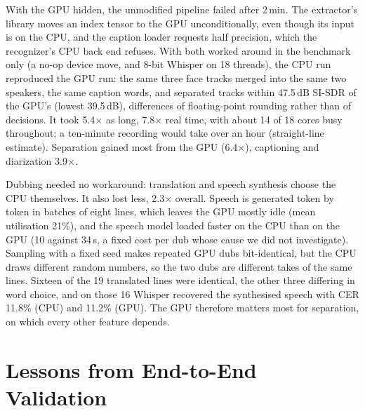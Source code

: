 \documentclass[conference]{IEEEtran}
\newcommand{\dB}{\,dB\xspace}
\begin{document}
With the GPU hidden, the unmodified pipeline failed after 2\,min. The extractor's library moves an index tensor to the GPU unconditionally, even though its input is on the CPU, and the caption loader requests half precision, which the recognizer's CPU back end refuses. With both worked around in the benchmark only (a no-op device move, and 8-bit Whisper on 18 threads), the CPU run reproduced the GPU run: the same three face tracks merged into the same two speakers, the same caption words, and separated tracks within 47.5\dB SI-SDR of the GPU's (lowest 39.5\dB), differences of floating-point rounding rather than of decisions. It took 5.4$\times$ as long, 7.8$\times$ real time, with about 14 of 18 cores busy throughout; a ten-minute recording would take over an hour (straight-line estimate). Separation gained most from the GPU (6.4$\times$), captioning and diarization 3.9$\times$.

Dubbing needed no workaround: translation and speech synthesis choose the CPU themselves. It also lost less, 2.3$\times$ overall. Speech is generated token by token in batches of eight lines, which leaves the GPU mostly idle (mean utilisation 21\%), and the speech model loaded faster on the CPU than on the GPU (10 against 34\,s, a fixed cost per dub whose cause we did not investigate). Sampling with a fixed seed makes repeated GPU dubs bit-identical, but the CPU draws different random numbers, so the two dubs are different takes of the same lines. Sixteen of the 19 translated lines were identical, the other three differing in word choice, and on those 16 Whisper recovered the synthesised speech with CER 11.8\% (CPU) and 11.2\% (GPU). The GPU therefore matters most for separation, on which every other feature depends.

\begin{table}[t]
\centering
\caption{One 52\,s two-speaker video processed, then dubbed into Hindi, on the GPU and with the GPU hidden (same workstation; each run loads its models)}
\label{tab:cpu}
\footnotesize
\setlength{\tabcolsep}{3.4pt}

\end{table}







\section{Lessons from End-to-End Validation}
\label{sec:lessons}
\end{document}
